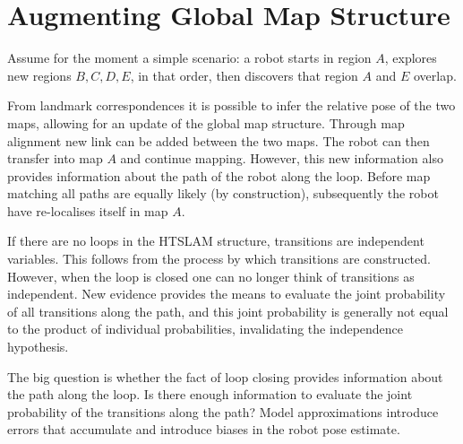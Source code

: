 

\section{Augmenting Global Map Structure}
\label{sec:global_map_update}

Assume for the moment a simple scenario: a robot starts in
region $A$, explores new regions $B,C,D,E$, in that order, then
discovers that region $A$ and $E$ overlap.

From landmark correspondences it is possible to infer the relative
pose of the two maps, allowing for an update of the global map
structure. Through map alignment new link can be added between the two
maps. The robot can then transfer into map $A$ and continue mapping.
However, this new information also provides information about the path
of the robot along the loop. Before map matching all paths are equally
likely (by construction), subsequently the robot have re-localises
itself in map $A$.

If there are no loops in the HTSLAM structure, transitions are
independent variables. This follows from the process by which
transitions are constructed.  However, when the loop is closed one can
no longer think of transitions as independent. New evidence provides
the means to evaluate the joint probability of all transitions along
the path, and this joint probability is generally not equal to the
product of individual probabilities, invalidating the independence
hypothesis.

The big question is whether the fact of loop closing provides
information about the path along the loop. Is there enough information
to evaluate the joint probability of the transitions along the
path? Model approximations introduce errors that accumulate and
introduce biases in the robot pose estimate.

